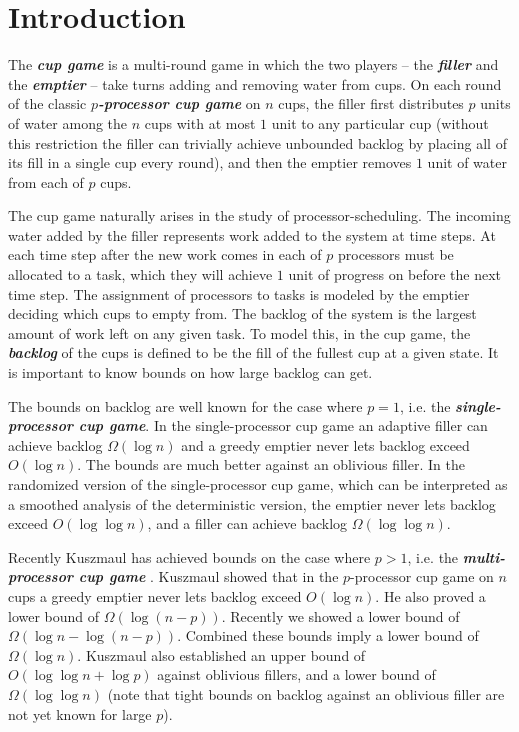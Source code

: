 \documentclass[twocolumn]{article}[10pt]
\newcommand{\defn}[1]{{\textit{\textbf{\boldmath #1}}}\xspace}
\renewcommand{\paragraph}[1]{\vspace{0.09in}\noindent{\bf \boldmath #1.}}
\begin{document}
\section{Introduction}\label{sec:intro}
\paragraph{Definition and Motivation}
The \defn{cup game} is a multi-round game in which the two players -- the
\defn{filler} and the \defn{emptier} -- take turns adding and removing water
from cups. On each round of the classic \defn{$p$-processor cup game} on $n$
cups, the filler first distributes $p$ units of water among
the $n$ cups with at most $1$ unit to any particular cup (without this
restriction the filler can trivially achieve unbounded backlog by placing all
of its fill in a single cup every round), and then the emptier 
removes $1$ unit of water from each of $p$ cups.

The cup game naturally arises in the study of processor-scheduling.
The incoming water added by the filler represents work added to the system at
time steps. At each time step after the new work comes in each of $p$
processors must be allocated to a task, which they will achieve $1$ unit of
progress on before the next time step. The assignment of processors to tasks is
modeled by the emptier deciding which cups to empty from. The backlog of
the system is the largest amount of work left on any given task. To model this,
in the cup game, the \defn{backlog} of the cups is defined to be the fill of
the fullest cup at a given state. 
It is important to know bounds on how large backlog can get.

\paragraph{Previous Work}
The bounds on backlog are well known for the case where $p=1$, i.e. the
\defn{single-processor cup game}.
In the single-processor cup game an adaptive filler can achieve backlog
$\Omega(\log n)$ and a greedy emptier never lets backlog exceed $O(\log n)$.
The bounds are much better against an oblivious filler.
In the randomized version of the single-processor cup game, which can be
interpreted as a smoothed analysis of the deterministic version, the emptier
never lets backlog exceed $O(\log \log n)$, and a filler can achieve backlog
$\Omega(\log\log n)$.

Recently Kuszmaul has achieved bounds on the case where $p>1$, i.e. the
\defn{multi-processor cup game} \cite{wku20}. Kuszmaul showed that in the 
$p$-processor cup game on $n$ cups a greedy emptier never lets backlog exceed
$O(\log n)$. He also proved a lower bound of $\Omega(\log (n-p))$. Recently we
showed a lower bound of $\Omega(\log n - \log (n-p))$. Combined these bounds
imply a lower bound of $\Omega(\log n)$.
Kuszmaul also established an upper bound of $O(\log\log n + \log p)$ against
oblivious fillers, and a lower bound of $\Omega(\log\log n)$ (note that tight
bounds on backlog against an oblivious filler are not yet known for large $p$).
\end{document}
